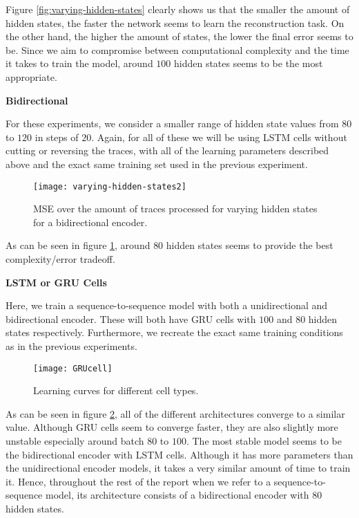 Figure \ref{fig:varying-hidden-states} clearly shows us that the smaller the amount of hidden states, the faster the network seems to learn the reconstruction task.
On the other hand, the higher the amount of states, the lower the final error seems to be.
Since we aim to compromise between computational complexity and the time it takes to train the model, around $100$ hidden states seems to be the most appropriate.

\newpage

\noindent
\textbf{Bidirectional}

For these experiments, we consider a smaller range of hidden state values from $80$ to $120$ in steps of $20$.
Again, for all of these we will be using LSTM cells without cutting or reversing the traces, with all of the learning parameters described above and the exact same training set used in the previous experiment.

\begin{figure}[ht]
  \centering
  \texttt{[image: varying-hidden-states2]}
  \caption{MSE over the amount of traces processed for varying hidden states for a bidirectional encoder.}
  \label{fig:varying-hidden-states2}
\end{figure}

\noindent
As can be seen in figure \ref{fig:varying-hidden-states2}, around $80$ hidden states seems to provide the best complexity/error tradeoff.

\newpage

\noindent
\textbf{LSTM or GRU Cells}

Here, we train a sequence-to-sequence model with both a unidirectional and bidirectional encoder.
These will both have GRU cells with $100$ and $80$ hidden states respectively.
Furthermore, we recreate the exact same training conditions as in the previous experiments.

\begin{figure}[ht]
  \centering
  \texttt{[image: GRUcell]}
  \caption{Learning curves for different cell types.}
  \label{fig:varying-cell-type}
\end{figure}

As can be seen in figure \ref{fig:varying-cell-type}, all of the different architectures converge to a similar value.
Although GRU cells seem to converge faster, they are also slightly more unstable especially around batch $80$ to $100$.
The most stable model seems to be the bidirectional encoder with LSTM cells.
Although it has more parameters than the unidirectional encoder models, it takes a very similar amount of time to train it.
Hence, throughout the rest of the report when we refer to a sequence-to-sequence model, its architecture consists of a bidirectional encoder with $80$ hidden states.

